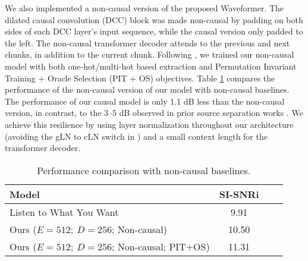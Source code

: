 {We also implemented a non-causal version of the proposed Waveformer. The dilated causal convolution (DCC) block was made non-causal by padding on both sides of each DCC layer’s input sequence, while the causal version only padded to the left. The non-causal transformer decoder attends to the previous and next chunks, in addition to the current chunk. Following \cite{2020arXiv200605712O}, we trained our non-causal model with both one-hot/multi-hot based extraction and Permutation Invariant Training + Oracle Selection (PIT + OS) objectives.  Table \ref{table:non_causal} compares the performance of the non-causal version of our model with non-causal baselines. The performance of our causal model is only 1.1 dB less than the non-causal version, in contrast, to the 3--5 dB observed in prior source separation works \cite{luo2019conv, subakan2022resource}. We achieve this resilience by using layer normalization throughout our architecture (avoiding the gLN to cLN switch in \cite{luo2019conv,subakan2022resource}) and a small context length for the transformer decoder.}













\begin{table}
\label{non_causal}
\caption{{Performance comparison with non-causal baselines.}}
\vspace{-.8em}
\centering
\begin{tabular}{lccc}
\toprule
Model                   & SI-SNRi  \\
\midrule
Listen to What You Want \cite{2020arXiv200605712O} & 9.91 \\
Ours ($E = 512;~D = 256$; Non-causal) & 10.50 \\
Ours ($E = 512;~D = 256$; Non-causal; PIT+OS) & 11.31 \\
\bottomrule
\end{tabular}
\label{table:non_causal}
\vskip -0.15in
\end{table}